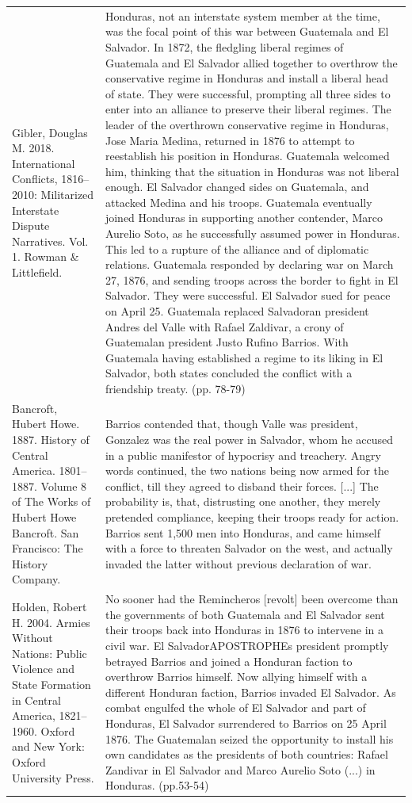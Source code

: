 {\begin{longtable}{p{}p{}}
Gibler, Douglas M. 2018. International Conflicts, 1816–2010: Militarized Interstate Dispute Narratives. Vol. 1. Rowman \& Littlefield. & Honduras, not an interstate system member at the time, was the focal point of this war between Guatemala and El Salvador. In 1872, the fledgling liberal regimes of Guatemala and El Salvador allied together to overthrow the conservative regime in Honduras and install a liberal head of state. They were successful, prompting all three sides to enter into an alliance to preserve their liberal regimes. The leader of the overthrown conservative regime in Honduras, Jose Maria Medina, returned in 1876 to attempt to reestablish his position in Honduras. Guatemala welcomed him, thinking that the situation in Honduras was not liberal enough. El Salvador changed sides on Guatemala, and attacked Medina and his troops. Guatemala eventually joined Honduras in supporting another contender, Marco Aurelio Soto, as he successfully assumed power in Honduras. This led to a rupture of the alliance and of diplomatic relations. Guatemala responded by declaring war on March 27, 1876, and sending troops across the border to fight in El Salvador. They were successful. El Salvador sued for peace on April 25. Guatemala replaced Salvadoran president Andres del Valle with Rafael Zaldivar, a crony of Guatemalan president Justo Rufino Barrios. With Guatemala having established a regime to its liking in El Salvador, both states concluded the conflict with a friendship treaty. (pp. 78-79)
\\
Bancroft, Hubert Howe. 1887. History of Central America. 1801–1887. Volume 8 of The Works of Hubert Howe Bancroft. San Francisco: The History Company. & Barrios contended that, though Valle was president, Gonzalez was the real power in Salvador, whom he accused in a public manifestor of hypocrisy and treachery. Angry words continued, the two nations being now armed for the conflict, till they agreed to disband their forces. [...] The probability is, that, distrusting one another, they merely pretended compliance, keeping their troops ready for action. Barrios sent 1,500 men into Honduras, and came himself with a force to threaten Salvador on the west, and actually invaded the latter without previous declaration of war.
\\
Holden, Robert H. 2004. Armies Without Nations: Public Violence and State Formation in Central America, 1821–1960. Oxford and New York: Oxford University Press. & No sooner had the Remincheros [revolt] been overcome than the governments of both Guatemala and El Salvador sent their troops back into Honduras in 1876 to intervene in a civil war. El SalvadorAPOSTROPHEs president promptly betrayed Barrios and joined a Honduran faction to overthrow Barrios himself. Now allying himself with a different Honduran faction, Barrios invaded El Salvador. As combat engulfed the whole of El Salvador and part of Honduras, El Salvador surrendered to Barrios on 25 April 1876. The Guatemalan seized the opportunity to install his own candidates as the presidents of both countries: Rafael Zandivar in El Salvador and Marco Aurelio Soto (...) in Honduras. (pp.53-54)

\end{longtable}}
